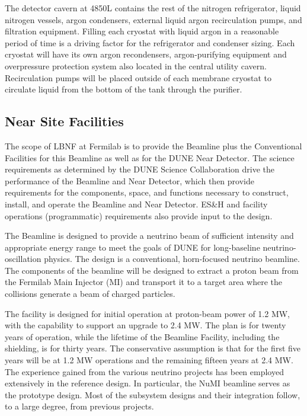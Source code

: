 The detector cavern at 4850L contains the rest of the nitrogen refrigerator, liquid nitrogen vessels, argon condensers, external liquid argon recirculation pumps, and filtration equipment. Filling each cryostat with liquid argon in a reasonable period of time is a driving factor for the refrigerator and condenser sizing.  Each cryostat will have its own argon recondensers, argon-purifying equipment and overpressure protection system also located in the central utility cavern. Recirculation pumps will be placed outside of each membrane cryostat to circulate liquid from the bottom of the tank through the purifier.

\subsection{Near Site Facilities}

The scope of LBNF at Fermilab is to provide the Beamline plus the Conventional Facilities for this Beamline as well as for the DUNE Near Detector. The science requirements as determined by the DUNE Science Collaboration drive the performance of the Beamline and Near Detector, which then provide requirements for the components, space, and functions necessary to construct, install, and operate the Beamline and Near Detector. ES&H and facility operations (programmatic) requirements also provide input to the design.

The Beamline is designed to provide a neutrino beam of sufficient intensity and appropriate energy range to meet the goals of DUNE for long-baseline neutrino-oscillation physics. The design is a conventional, horn-focused neutrino beamline. The components of the beamline will be designed to extract a proton beam from the Fermilab Main Injector (MI) and transport it to a target area where the collisions generate a beam of charged particles. 

The facility is designed for initial operation at proton-beam power of 1.2 MW, with the capability to support an upgrade to 2.4 MW. The plan is for twenty years of operation, while the lifetime of the Beamline Facility, including the shielding, is for thirty years. The conservative assumption is that for the first five years will be at 1.2 MW operations and the remaining fifteen years at 2.4 MW.  
The experience gained from the various neutrino projects has been employed extensively in the reference design. In particular, the NuMI beamline serves as the prototype design. Most of the subsystem designs and their integration follow, to a large degree, from previous projects. 

